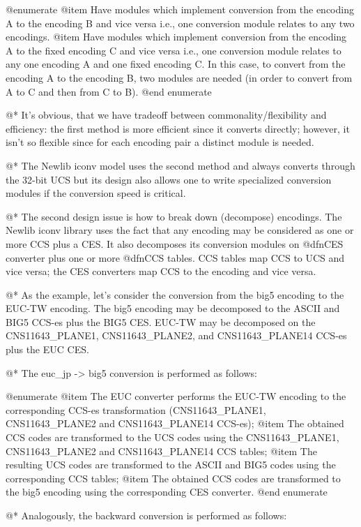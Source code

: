 @enumerate
@item
Have modules which implement conversion from the encoding A to the encoding B
and vice versa i.e., one conversion module relates to any two encodings.
@item
Have modules which implement conversion from the encoding A to the fixed
encoding C and vice versa i.e., one conversion module relates to any
one encoding A and one fixed encoding C. In this case, to convert from
the encoding A to the encoding B, two modules are needed (in order to convert
from A to C and then from C to B).
@end enumerate

@*
It's obvious, that we have tradeoff between commonality/flexibility and
efficiency: the first method is more efficient since it converts
directly; however, it isn't so flexible since for each
encoding pair a distinct module is needed.

@*
The Newlib iconv model uses the second method and always converts through the 32-bit
UCS but its design also allows one to write specialized conversion
modules if the conversion speed is critical.

@*
The second design issue is how to break down (decompose) encodings.
The Newlib iconv library uses the fact that any encoding may be
considered as one or more CCS plus a CES. It also decomposes its
conversion modules on @dfn{CES converter} plus one or more @dfn{CCS
tables}. CCS tables map CCS to UCS and vice versa; the CES converters
map CCS to the encoding and vice versa.

@*
As the example, let's consider the conversion from the big5 encoding to
the EUC-TW encoding. The big5 encoding may be decomposed to the ASCII and BIG5
CCS-es plus the BIG5 CES. EUC-TW may be decomposed on the CNS11643_PLANE1, CNS11643_PLANE2,
and CNS11643_PLANE14 CCS-es plus the EUC CES.

@*
The euc_jp -> big5 conversion is performed as follows:

@enumerate
@item
The EUC converter performs the EUC-TW encoding to the corresponding CCS-es
transformation (CNS11643_PLANE1, CNS11643_PLANE2 and CNS11643_PLANE14
CCS-es);
@item
The obtained CCS codes are transformed to the UCS codes using the CNS11643_PLANE1,
CNS11643_PLANE2 and CNS11643_PLANE14 CCS tables;
@item
The resulting UCS codes are transformed to the ASCII and BIG5 codes using
the corresponding CCS tables;
@item
The obtained CCS codes are transformed to the big5 encoding using the corresponding
CES converter.
@end enumerate

@*
Analogously, the backward conversion is performed as follows:

